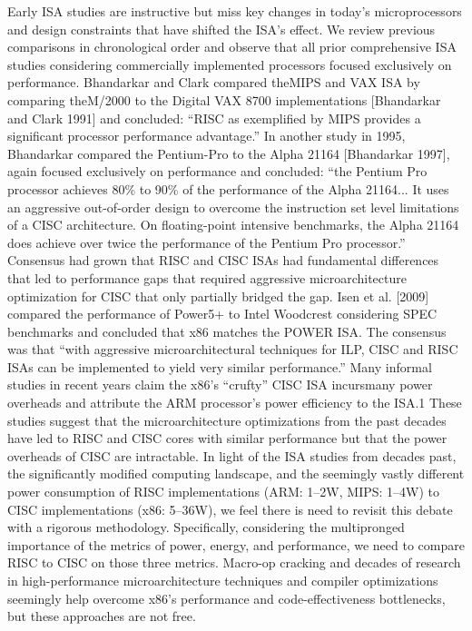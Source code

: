\label{sec:related}

Early ISA studies are instructive but miss key changes in today’s
microprocessors and design constraints that have shifted the ISA’s effect. We review
previous comparisons in chronological order and observe that all prior comprehensive
ISA studies considering commercially implemented processors focused exclusively on
performance.
Bhandarkar and Clark compared theMIPS and VAX ISA by comparing theM/2000 to
the Digital VAX 8700 implementations [Bhandarkar and Clark 1991] and concluded:
“RISC as exemplified by MIPS provides a significant processor performance advantage.”
In another study in 1995, Bhandarkar compared the Pentium-Pro to the Alpha
21164 [Bhandarkar 1997], again focused exclusively on performance and concluded:
“the Pentium Pro processor achieves 80\% to 90\% of the performance of the Alpha
21164... It uses an aggressive out-of-order design to overcome the instruction set level
limitations of a CISC architecture. On floating-point intensive benchmarks, the Alpha
21164 does achieve over twice the performance of the Pentium Pro processor.” Consensus
had grown that RISC and CISC ISAs had fundamental differences that led to
performance gaps that required aggressive microarchitecture optimization for CISC
that only partially bridged the gap.
Isen et al. [2009] compared the performance of Power5+ to Intel Woodcrest considering
SPEC benchmarks and concluded that x86 matches the POWER ISA. The
consensus was that “with aggressive microarchitectural techniques for ILP, CISC and
RISC ISAs can be implemented to yield very similar performance.”
Many informal studies in recent years claim the x86’s “crufty” CISC ISA incursmany
power overheads and attribute the ARM processor’s power efficiency to the ISA.1 These
studies suggest that the microarchitecture optimizations from the past decades have
led to RISC and CISC cores with similar performance but that the power overheads of
CISC are intractable.
In light of the ISA studies from decades past, the significantly modified computing
landscape, and the seemingly vastly different power consumption of RISC implementations
(ARM: 1–2W, MIPS: 1–4W) to CISC implementations (x86: 5–36W), we feel there
is need to revisit this debate with a rigorous methodology. Specifically, considering the
multipronged importance of the metrics of power, energy, and performance, we need to
compare RISC to CISC on those three metrics. Macro-op cracking and decades of research
in high-performance microarchitecture techniques and compiler optimizations
seemingly help overcome x86’s performance and code-effectiveness bottlenecks, but these approaches are not free. 